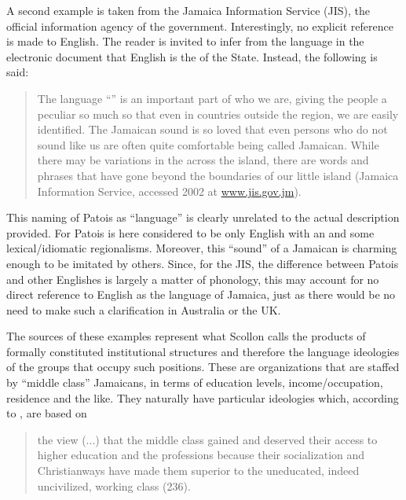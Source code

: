 A second example is taken from the Jamaica Information Service (JIS), the official information agency of the government.  Interestingly, no explicit reference is made to English.  The reader is invited to infer from the language in the electronic document that English is the  of the State.  Instead, the following is said:

\begin{quote}
The language “” is an important part of who we are, giving the people a peculiar  so much so that even in countries outside the region, we are easily identified.  The Jamaican sound is so loved that even persons who do not sound like us are often quite comfortable being called Jamaican.  While there may be variations in the   across the island, there are words and phrases that have gone beyond the boundaries of our little island (Jamaica Information Service, accessed 2002 at \url{www.jis.gov.jm}).
\end{quote}

This naming of Patois as “language” is clearly unrelated to the actual description provided.  For Patois is here considered to be only English with an  and some lexical\slash idiomatic regionalisms.  Moreover, this “sound” of a Jamaican is charming enough to be imitated by others.  Since, for the JIS, the difference between Patois and other Englishes is largely a matter of phonology, this may account for no direct reference to English as the language of Jamaica, just as there would be no need to make such a clarification in Australia or the UK. 

The sources of these examples represent what Scollon calls the products of formally constituted institutional structures and therefore the language ideologies of the groups that occupy such positions.  These are organizations that are staffed by “middle class” Jamaicans, in terms of education levels, income\slash occupation, residence and the like.  They naturally have particular ideologies which, according to \citet{Austin1983}, are based on

\begin{quote}the view (...) that the middle class gained and deserved their access to higher education and the professions because their socialization and Christian\linebreak ways have made them superior to the uneducated, indeed uncivilized, working class (236).\end{quote}

